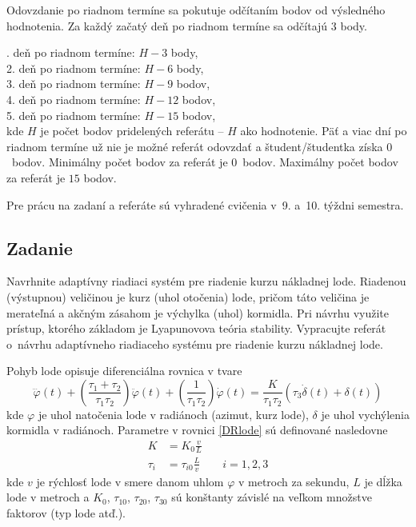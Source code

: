 ﻿\documentclass[a4paper, 10pt, ]{article}
\begin{document}
\bigskip

\noindent
Odovzdanie po riadnom termíne sa pokutuje odčítaním bodov od výsledného hodnotenia. Za každý začatý deň po riadnom termíne sa odčítajú 3 body.

. deň po riadnom termíne: $H-3$ body,\\
2. deň po riadnom termíne: $H-6$ body,\\
3. deň po riadnom termíne: $H-9$ bodov,\\
4. deň po riadnom termíne: $H-12$ bodov,\\
5. deň po riadnom termíne: $H-15$ bodov,\\
kde $H$ je počet bodov pridelených referátu -- $H$ ako hodnotenie. Päť a viac dní po riadnom termíne už nie je možné referát odovzdať a študent/študentka získa $0$~bodov. Minimálny počet bodov za referát je $0$~bodov. Maximálny počet bodov za referát je $15$ bodov.


\bigskip

\noindent
Pre prácu na zadaní a referáte sú vyhradené cvičenia v~9. a~10. týždni semestra.




\subsection{Zadanie}

\noindent
Navrhnite adaptívny riadiaci systém pre riadenie kurzu nákladnej lode. Riadenou (výstupnou) veličinou je kurz (uhol otočenia) lode, pričom táto veličina je merateľná a akčným zásahom je výchylka (uhol) kormidla. Pri návrhu využite prístup, ktorého základom je Lyapunovova teória stability. Vypracujte referát o~návrhu adaptívneho riadiaceho systému pre riadenie kurzu nákladnej lode.

Pohyb lode opisuje diferenciálna rovnica v tvare \cite{PY98}
\begin{equation} \label{DRlode}
	\dddot{\varphi}(t)
	+
	\left(
		\frac{\tau_1 + \tau_2}{\tau_1 \tau_2}
	\right)
	\ddot{\varphi}(t)
	+
	\left(
		\frac{1}{\tau_1 \tau_2}
	\right)
	\dot{\varphi}(t)
	=
	\frac{K}{\tau_1 \tau_2}
	\left(
		\tau_3
		\dot{\delta}(t)
		+
		\delta(t)
	\right)
\end{equation}
kde $\varphi$ je uhol natočenia lode v radiánoch (azimut, kurz lode), $\delta$ je uhol vychýlenia kormidla v radiánoch. Parametre v rovnici \eqref{DRlode} sú definované nasledovne
\begin{align}
	K &= K_0 \frac{v}{L} \\
	\tau_i &= \tau_{i0} \frac{L}{v} \qquad i=1,2,3
\end{align}
kde $v$ je rýchlosť lode v smere danom uhlom $\varphi$ v metroch za sekundu, $L$ je dĺžka lode v metroch a $K_0$, $\tau_{10}$, $\tau_{20}$, $\tau_{30}$ sú konštanty závislé na veľkom množstve faktorov (typ lode atď.).
\end{document}
